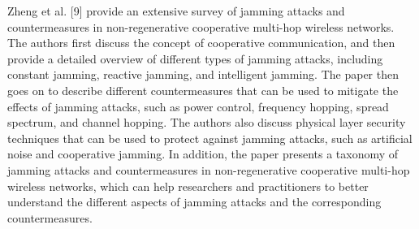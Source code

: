 \documentclass[conference]{IEEEtran}
\begin{document}
Zheng et al. [9] provide an extensive survey of jamming attacks and countermeasures in non-regenerative cooperative multi-hop wireless networks. The authors first discuss the concept of cooperative communication, and then provide a detailed overview of different types of jamming attacks, including constant jamming, reactive jamming, and intelligent jamming. The paper then goes on to describe different countermeasures that can be used to mitigate the effects of jamming attacks, such as power control, frequency hopping, spread spectrum, and channel hopping. The authors also discuss physical layer security techniques that can be used to protect against jamming attacks, such as artificial noise and cooperative jamming. In addition, the paper presents a taxonomy of jamming attacks and countermeasures in non-regenerative cooperative multi-hop wireless networks, which can help researchers and practitioners to better understand the different aspects of jamming attacks and the corresponding countermeasures.
\end{document}
